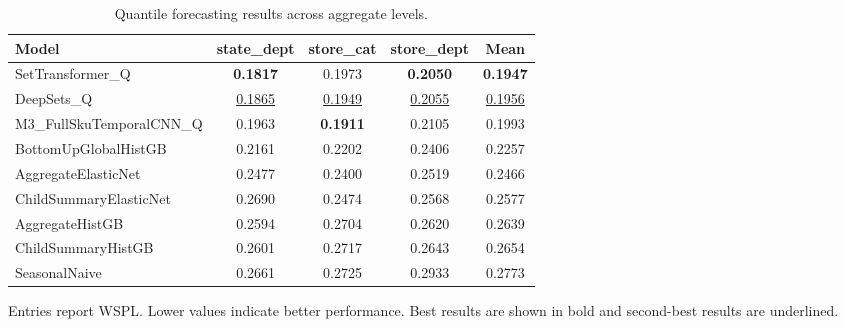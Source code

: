 \begin{table}[H]
\centering
\caption{Quantile forecasting results across aggregate levels.}
\label{tab:main_quantile}
\begin{threeparttable}
\begin{tabular}{lcccc}
\toprule
Model & state\_dept & store\_cat & store\_dept & Mean \\
\midrule
SetTransformer\_Q & \textbf{0.1817} & 0.1973 & \textbf{0.2050} & \textbf{0.1947} \\
DeepSets\_Q & \underline{0.1865} & \underline{0.1949} & \underline{0.2055} & \underline{0.1956} \\
M3\_FullSkuTemporalCNN\_Q & 0.1963 & \textbf{0.1911} & 0.2105 & 0.1993 \\
BottomUpGlobalHistGB & 0.2161 & 0.2202 & 0.2406 & 0.2257 \\
AggregateElasticNet & 0.2477 & 0.2400 & 0.2519 & 0.2466 \\
ChildSummaryElasticNet & 0.2690 & 0.2474 & 0.2568 & 0.2577 \\
AggregateHistGB & 0.2594 & 0.2704 & 0.2620 & 0.2639 \\
ChildSummaryHistGB & 0.2601 & 0.2717 & 0.2643 & 0.2654 \\
SeasonalNaive & 0.2661 & 0.2725 & 0.2933 & 0.2773 \\
\bottomrule
\end{tabular}
\begin{tablenotes}
\footnotesize \item Entries report WSPL. Lower values indicate better performance. Best results are shown in bold and second-best results are underlined.
\end{tablenotes}
\end{threeparttable}
\end{table}
